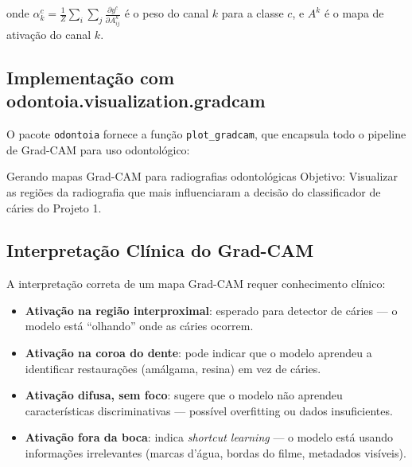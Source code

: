 onde $\alpha_{k}^{c} = \frac{1}{Z} \sum_{i} \sum_{j} \frac{\partial y^{c}}{\partial A_{ij}^{k}}$
é o peso do canal $k$ para a classe $c$, e $A^{k}$ é o mapa de ativação
do canal $k$.

\subsection{Implementação com odontoia.visualization.gradcam}

O pacote \texttt{odontoia} fornece a função \texttt{plot\_gradcam}, que
encapsula todo o pipeline de Grad-CAM para uso odontológico:

\begin{pratica}{Gerando mapas Grad-CAM para radiografias odontológicas}
  Objetivo: Visualizar as regiões da radiografia que mais influenciaram
  a decisão do classificador de cáries do Projeto 1.
\end{pratica}


\subsection{Interpretação Clínica do Grad-CAM}

A interpretação correta de um mapa Grad-CAM requer conhecimento clínico:

\begin{itemize}
  \item \textbf{Ativação na região interproximal}: esperado para detector
    de cáries — o modelo está ``olhando'' onde as cáries ocorrem.
  \item \textbf{Ativação na coroa do dente}: pode indicar que o modelo
    aprendeu a identificar restaurações (amálgama, resina) em vez de cáries.
  \item \textbf{Ativação difusa, sem foco}: sugere que o modelo não
    aprendeu características discriminativas — possível overfitting ou
    dados insuficientes.
  \item \textbf{Ativação fora da boca}: indica \textit{shortcut learning}
    — o modelo está usando informações irrelevantes (marcas d'água,
    bordas do filme, metadados visíveis).
\end{itemize}


